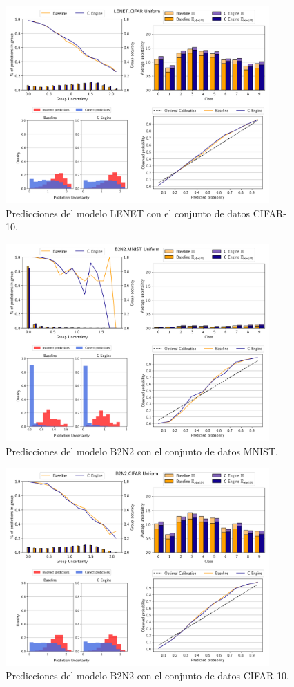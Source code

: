 \begin{figure}[ht]
    \centering
    \includegraphics[width=0.9\textwidth]{root/Imagenes/anexo/Uniform-LENET_CIFAR-mosaic.png}
    \caption{Predicciones del modelo LENET con el conjunto de datos CIFAR-10.}
    \label{fig:anx-Uniform-LENET_CIFAR}
\end{figure}


\begin{figure}[ht]
    \centering
    \includegraphics[width=0.9\textwidth]{root/Imagenes/anexo/Uniform-B2N2_MNIST-mosaic.png}
    \caption{Predicciones del modelo B2N2 con el conjunto de datos MNIST.}
    \label{fig:anx-Uniform-B2N2_MNIST}
\end{figure}


\begin{figure}[ht]
    \centering
    \includegraphics[width=0.9\textwidth]{root/Imagenes/anexo/Uniform-B2N2_CIFAR-mosaic.png}
    \caption{Predicciones del modelo B2N2 con el conjunto de datos CIFAR-10.}
    \label{fig:anx-Uniform-B2N2_CIFAR}
\end{figure}

